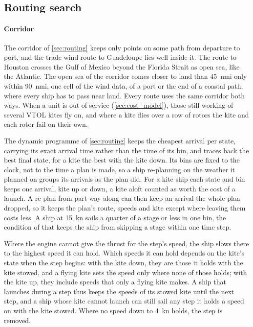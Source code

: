 \subsection{Routing search}
\label{sec:det_routing}

\paragraph{Corridor} The corridor of \cref{sec:routing} keeps only points on some path from departure to port, and the trade-wind route to Guadeloupe lies well inside it. The route to Houston crosses the Gulf of Mexico beyond the Florida Strait as open sea, like the Atlantic. The open sea of the corridor comes closer to land than \SI{45}{nmi} only within \SI{90}{nmi}, one cell of the wind data, of a port or the end of a coastal path, where every ship has to pass near land. Every route uses the same corridor both ways. When a unit is out of service (\cref{sec:cost_model}), those still working of several VTOL kites fly on, and where a kite flies over a row of rotors the kite and each rotor fail on their own.

The dynamic programme of \cref{sec:routing} keeps the cheapest arrival per state, carrying its exact arrival time rather than the time of its bin, and traces back the best final state, for a kite the best with the kite down. Its bins are fixed to the clock, not to the time a plan is made, so a ship re-planning on the weather it planned on groups its arrivals as the plan did. For a kite ship each state and bin keeps one arrival, kite up or down, a kite aloft counted as worth the cost of a launch. A re-plan from part-way along can then keep an arrival the whole plan dropped, so it keeps the plan's route, speeds and kite except where leaving them costs less. A ship at \SI{15}{kn} sails a quarter of a stage or less in one bin, the condition of \citet{wendling2025} that keeps the ship from skipping a stage within one time step.

Where the engine cannot give the thrust for the step's speed, the ship slows there to the highest speed it can hold. Which speeds it can hold depends on the kite's state when the step begins: with the kite down, they are those it holds with the kite stowed, and a flying kite sets the speed only where none of those holds; with the kite up, they include speeds that only a flying kite makes. A ship that launches during a step thus keeps the speeds of its stowed kite until the next step, and a ship whose kite cannot launch can still sail any step it holds a speed on with the kite stowed. Where no speed down to \SI{4}{kn} holds, the step is removed.

